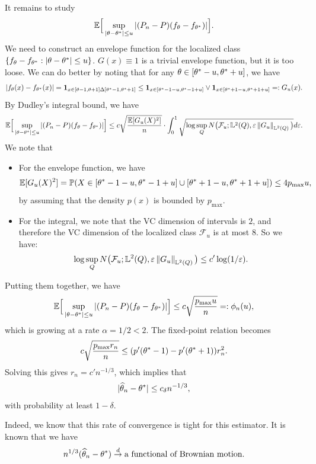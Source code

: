 \documentclass[11pt,letterpaper]{article}
\numberwithin{theorem}{lecture}
\numberwithin{proposition}{lecture}
\numberwithin{lemma}{lecture}
\numberwithin{claim}{lecture}
\numberwithin{corollary}{lecture}
\numberwithin{definition}{lecture}
\numberwithin{conjecture}{lecture}
\numberwithin{remark}{lecture}
\numberwithin{example}{lecture}
\numberwithin{equation}{lecture}
\begin{document}
It remains to study
\begin{align*}
  {\mathbb{E}} \Big[ \sup_{|\theta - {\theta^*}| \leq u} |(P_n - P) (f_\theta - f_{{\theta^*}})| \Big].
\end{align*}
We need to construct an envelope function for the localized class $\{f_\theta - f_{{\theta^*}}: |\theta - {\theta^*}| \leq u\}$. $G (x) \equiv 1$ is a trivial envelope function, but it is too loose. We can do better by noting that for any $\theta \in [{\theta^*} - u, {\theta^*} + u]$, we have
\begin{align*}
  |f_\theta (x) - f_{{\theta^*}} (x)| = \bm{1}_{x \in [\theta - 1, \theta + 1] \Delta [{\theta^*} - 1, {\theta^*} + 1]} \leq \bm{1}_{x \in [{\theta^*} -1 - u, {\theta^*} - 1 + u]} \vee \bm{1}_{x \in [{\theta^*} + 1 - u, {\theta^*} + 1 + u]} = : G_u (x).
\end{align*}
By Dudley's integral bound, we have
\begin{align*}
  {\mathbb{E}} \Big[ \sup_{|\theta - {\theta^*}| \leq u} |(P_n - P) (f_\theta - f_{{\theta^*}})| \Big] \leq c \sqrt{\frac{{\mathbb{E}} [G_u (X)^2]}{n}} \cdot \int_0^1 \sqrt{\log \sup_{Q} N \big(\mathcal{F}_u; \mathbb{L}^2 (Q),  \varepsilon \left\| G_u\right\|_{\mathbb{L}^2 (Q)} \big)} d \varepsilon.
\end{align*}
We note that
\begin{itemize}
\item For the envelope function, we have
\begin{align*}
  {\mathbb{E}} [G_u (X)^2] = {\mathbb{P}} (X \in [{\theta^*} - 1 - u, {\theta^*} - 1 + u] \cup [{\theta^*} + 1 - u, {\theta^*} + 1 + u]) \leq 4 p_{\max} u,
\end{align*}
by assuming that the density $p(x)$ is bounded by $p_{\max}$.
\item For the integral, we note that the VC dimension of intervals is $2$, and therefore the VC dimension of the localized class $\mathcal{F}_u$ is at most $8$. So we have:
\begin{align*}
  \log \sup_{Q} N \big(\mathcal{F}_u; \mathbb{L}^2 (Q),  \varepsilon \left\| G_u\right\|_{\mathbb{L}^2 (Q)} \big) \leq c' \log (1/ \varepsilon).
\end{align*}
\end{itemize}
Putting them together, we have
\begin{align*}
  {\mathbb{E}} \Big[ \sup_{|\theta - {\theta^*}| \leq u} |(P_n - P) (f_\theta - f_{{\theta^*}})| \Big]  \leq c \sqrt{\frac{p_{\max} u}{n}} =: \phi_n (u),
\end{align*}
which is growing at a rate $\alpha = 1/2 < 2$. The fixed-point relation becomes
\begin{align*}
  c \sqrt{\frac{p_{\max} r_n}{n}} \leq  (p' ({\theta^*} - 1) - p' ({\theta^*} + 1)) r_n^2.
\end{align*}
Solving this gives $r_n = c' n^{-1/3}$, which implies that
\begin{align*}
  |\widehat{\theta}_n - {\theta^*}| \leq c_\delta n^{-1/3},
\end{align*}
with probability at least $1 - \delta$.

Indeed, we know that this rate of convergence is tight for this estimator. It is known that we have
\begin{align*}
  n^{1/3} (\widehat{\theta}_n - {\theta^*}) \overset{d}{\to} \text{a functional of Brownian motion}.
\end{align*}
\end{document}
